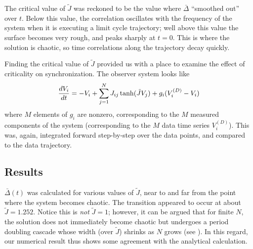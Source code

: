 \documentclass{article} %
\begin{document}
The critical value of $\tilde{J}$ was reckoned to be the value where $\bar{\Delta}$ ``smoothed out'' over $t$.  Below this value, the correlation oscillates with the frequency of the system when it is executing a limit cycle trajectory; well above this value the surface becomes very rough, and peaks sharply at $t=0$.  This is where the solution is chaotic, so time correlations along the trajectory decay quickly.

Finding the critical value of $\tilde{J}$ provided us with a place to examine the effect of criticality on synchronization. The observer system looks like
\begin{align}
	\frac{d V_i}{d t} = -V_i + \sum_{j=1}^{N} J_{ij} \tanh(\tilde{J} V_j) + g_i (V^{(D)}_i - V_i)
\end{align}
where $M$ elements of $g_i$ are nonzero, corresponding to the $M$ measured components of the system (corresponding to the $M$ data time series $V_i^{(D)}$).  This was, again, integrated forward step-by-step over the data points, and compared to the data trajectory.

\subsection{Results}
$\bar{\Delta}(t)$ was calculated for various values of $\tilde{J}$, near to and far from the point where the system becomes chaotic.  The transition appeared to occur at about $\tilde{J} = 1.252$.  Notice this is \emph{not} $\tilde{J}=1$; however, it can be argued that for finite $N$, the solution does not immediately become chaotic but undergoes a period doubling cascade whose width (over $\tilde{J}$) shrinks as $N$ grows (see \cite{Sompolinsky1988}).  In this regard, our numerical result thus shows some agreement with the analytical calculation.
\end{document}
